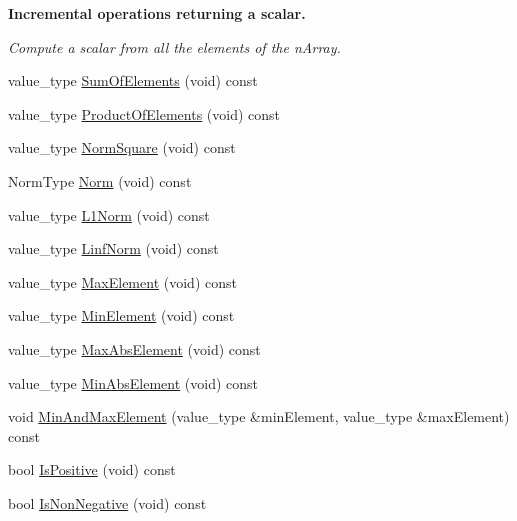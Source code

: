 \begin{Indent}{\bf Incremental operations returning a scalar.}\par
{\em Compute a scalar from all the elements of the n\-Array. }\begin{DoxyCompactItemize}
\item 
value\-\_\-type \hyperlink{classvct_dynamic_const_n_array_base_a57b568c584c363c2811e5c1020484a57}{Sum\-Of\-Elements} (void) const 
\item 
value\-\_\-type \hyperlink{classvct_dynamic_const_n_array_base_af46f916cfbd94c520eab783e89377232}{Product\-Of\-Elements} (void) const 
\item 
value\-\_\-type \hyperlink{classvct_dynamic_const_n_array_base_adb4a5b2ba7dd8a5814756dd1d156418f}{Norm\-Square} (void) const 
\item 
Norm\-Type \hyperlink{classvct_dynamic_const_n_array_base_a817b97a96452a366917e8192ce79bd1d}{Norm} (void) const 
\item 
value\-\_\-type \hyperlink{classvct_dynamic_const_n_array_base_ad40fd31ef428487dae1ebba1191f7931}{L1\-Norm} (void) const 
\item 
value\-\_\-type \hyperlink{classvct_dynamic_const_n_array_base_ac1fe0f248814f603db02bb7d7d6d7bed}{Linf\-Norm} (void) const 
\item 
value\-\_\-type \hyperlink{classvct_dynamic_const_n_array_base_a0a81dadfe1f7fb3fdc4c7c5b345a51da}{Max\-Element} (void) const 
\item 
value\-\_\-type \hyperlink{classvct_dynamic_const_n_array_base_a3835074720e7ac6fc54ac47afa9aa4e9}{Min\-Element} (void) const 
\item 
value\-\_\-type \hyperlink{classvct_dynamic_const_n_array_base_ae89d2f8d6e7a3437a03a4fd2ab5345b4}{Max\-Abs\-Element} (void) const 
\item 
value\-\_\-type \hyperlink{classvct_dynamic_const_n_array_base_a93595c4cdf9c5954bfd67951490eeb64}{Min\-Abs\-Element} (void) const 
\item 
void \hyperlink{classvct_dynamic_const_n_array_base_aed4934d1e01e31ed89e7f1cff84b1f1e}{Min\-And\-Max\-Element} (value\-\_\-type \&min\-Element, value\-\_\-type \&max\-Element) const 
\item 
bool \hyperlink{classvct_dynamic_const_n_array_base_aab97f28208b7261a5946e3ead1649817}{Is\-Positive} (void) const 
\item 
bool \hyperlink{classvct_dynamic_const_n_array_base_a80f711e9249e3ceede696133bef1025f}{Is\-Non\-Negative} (void) const 
\item 

\end{DoxyCompactItemize}
\end{Indent}
